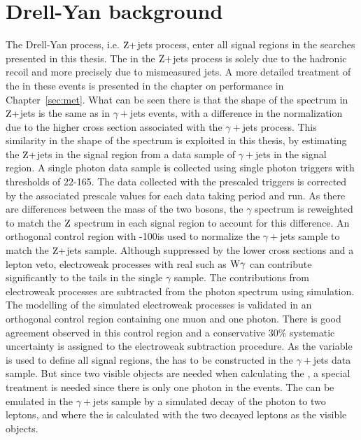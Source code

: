 \section{Drell-Yan background}\label{sec:mettemplates}
\noindent
\justify
The Drell-Yan process, i.e. $\mathrm{Z}+$jets process, enter all signal regions in the searches presented in this thesis. 
The \ptmiss in the $\mathrm{Z}+$jets process is solely due to the hadronic recoil and more precisely due to mismeasured jets. 
A more detailed treatment of the \ptmiss in these events is presented in the chapter on \ptmiss performance in Chapter~\ref{sec:met}. 
What can be seen there is that the shape of the \ptmiss spectrum in $\mathrm{Z}+$jets is the same as in $\gamma+$jets events, with a difference in the normalization due to the higher cross section associated with the $\gamma+$jets process. 
This similarity in the shape of the \ptmiss spectrum is exploited in this thesis, by estimating the $\mathrm{Z}+$jets in the signal region from a data sample of $\gamma+$jets in the signal region. 
A single photon data sample is collected using single photon triggers with \pt thresholds of 22-165\GeV. 
The data collected with the prescaled triggers is corrected by the associated prescale values for each data taking period and run. 
As there are differences between the mass of the two bosons, the $\gamma$ \pt spectrum is reweighted to match the $\mathrm{Z}$ spectrum in each signal region to account for this difference. 
An orthogonal control region with -100\GeV is used to normalize the $\gamma+$jets sample to match the $\mathrm{Z}+$jets sample.
Although suppressed by the lower cross sections and a lepton veto, electroweak processes with real \ptmiss such as $\mathrm{W}\gamma$ can contribute significantly to the \ptmiss tails in the single $\gamma$ sample.
The contributions from electroweak processes are subtracted from the photon \ptmiss spectrum using simulation. 
The modelling of the simulated electroweak processes is validated in an orthogonal control region containing one muon and one photon. 
There is good agreement observed in this control region and a conservative 30\% systematic uncertainty is assigned to the electroweak subtraction procedure.   
As the \mttwo variable is used to define all signal regions, the \mttwo has to be constructed in the $\gamma+$jets data sample. 
But since two visible objects are needed when calculating the \mttwo, a special treatment is needed since there is only one photon in the events. 
The \mttwol can be emulated in the $\gamma+$jets sample by a simulated decay of the photon to two leptons, and where the \mttwol is calculated with the two decayed leptons as the visible objects.
